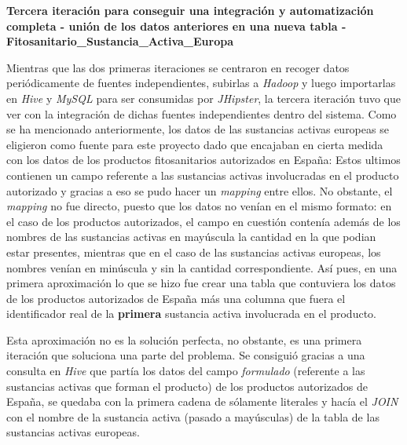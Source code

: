 \par 
\textbf{Tercera iteración para conseguir una integración y automatización completa - unión de los datos anteriores en una nueva tabla - Fitosanitario\_Sustancia\_Activa\_Europa}
\bigskip
\par 
Mientras que las dos primeras iteraciones se centraron en recoger datos periódicamente de fuentes independientes, subirlas a \textit{Hadoop} y luego importarlas en \textit{Hive} y \textit{MySQL} para ser consumidas por \textit{JHipster}, la tercera iteración tuvo que ver con la integración de dichas fuentes independientes dentro del sistema. Como se ha mencionado anteriormente, los datos de las sustancias activas europeas se eligieron como fuente para este proyecto dado que encajaban en cierta medida con los datos de los productos fitosanitarios autorizados en España:  Estos ultimos contienen un campo referente a las sustancias activas involucradas en el producto autorizado y gracias a eso se pudo hacer un \textit{mapping} entre ellos. No obstante, el \textit{mapping} no fue directo, puesto que los datos no venían en el mismo formato: en el caso de los productos autorizados, el campo en cuestión contenía además de los nombres de las sustancias activas en mayúscula la cantidad en la que podian estar presentes, mientras que en el caso de las sustancias activas europeas, los nombres venían en minúscula y sin la cantidad correspondiente. Así pues, en una primera aproximación lo que se hizo fue crear una tabla que contuviera los datos de los productos autorizados de España más una columna que fuera el identificador real de la \textbf{primera} sustancia activa involucrada en el producto. \par Esta aproximación no es la solución perfecta, no obstante, es una primera iteración que soluciona una parte del problema. Se consiguió gracias a una consulta en \textit{Hive} que partía los datos del campo \textit{formulado} (referente a las sustancias activas que forman el producto) de los productos autorizados de España, se quedaba con la primera cadena de sólamente literales y hacía el \textit{JOIN} con el nombre de la sustancia activa (pasado a mayúsculas) de la tabla de las sustancias activas europeas. 
